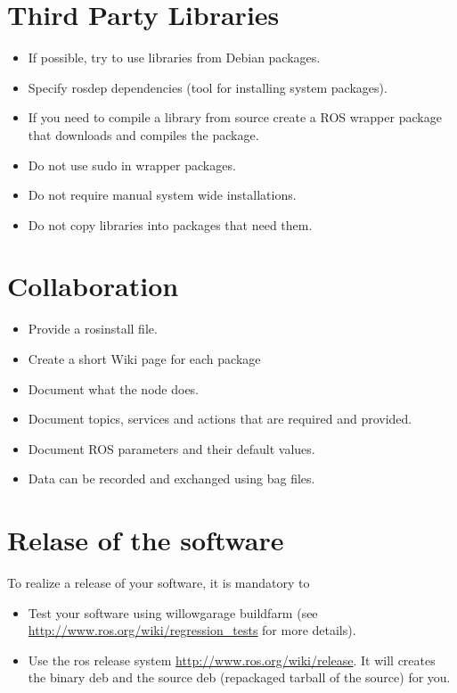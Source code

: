 \section{Third Party Libraries}
\begin{itemize}
\item If possible, try to use libraries from Debian packages.
\item Specify rosdep dependencies (tool for installing system packages).
\item If you need to compile a library from source create a ROS wrapper
package that downloads and compiles the package.
\item Do not use sudo in wrapper packages.
\item Do not require manual system wide installations.
\item Do not copy libraries into packages that need them.
\end{itemize}


\section{Collaboration}
\begin{itemize}
\item Provide a rosinstall file.
\item Create a short Wiki page for each package
\item Document what the node does.
\item Document topics, services and actions that are required and
provided.
\item Document ROS parameters and their default values.
\item Data can be recorded and exchanged using bag files.
\end{itemize}

\section{Relase of the software}

To realize a release of your software, it is mandatory to 
\begin{itemize}
\item Test your software using willowgarage buildfarm (see \url{http://www.ros.org/wiki/regression_tests} for more details).
\item Use the ros release system \url{http://www.ros.org/wiki/release}.
It will creates the binary deb and the source deb (repackaged tarball of the source) for you. 
\end{itemize}

